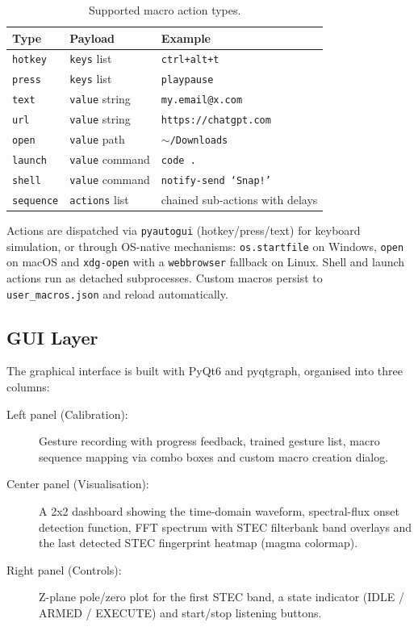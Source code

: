 \documentclass[12pt,a4paper]{article}
\begin{document}
\begin{table}[h]
\centering
\caption{Supported macro action types.}
\label{tab:macro-types}
\begin{tabular}{@{}lll@{}}
\toprule
Type & Payload & Example \\
\midrule
\texttt{hotkey} & \texttt{keys} list & \texttt{ctrl+alt+t} \\
\texttt{press}  & \texttt{keys} list & \texttt{playpause} \\
\texttt{text}   & \texttt{value} string & \texttt{my.email@x.com} \\
\texttt{url}    & \texttt{value} string & \texttt{https://chatgpt.com} \\
\texttt{open}   & \texttt{value} path  & \texttt{$\sim$/Downloads} \\
\texttt{launch} & \texttt{value} command & \texttt{code .} \\
\texttt{shell}  & \texttt{value} command & \texttt{notify-send `Snap!'} \\
\texttt{sequence} & \texttt{actions} list & chained sub-actions with delays \\
\bottomrule
\end{tabular}
\end{table}

Actions are dispatched via \texttt{pyautogui} (hotkey/press/text) for keyboard simulation, or through OS-native mechanisms: \texttt{os.startfile} on Windows, \texttt{open} on macOS and \texttt{xdg-open} with a \texttt{webbrowser} fallback on Linux. Shell and launch actions run as detached subprocesses. Custom macros persist to \texttt{user\_macros.json} and reload automatically.

\subsection{GUI Layer}

The graphical interface is built with PyQt6 and pyqtgraph, organised into three columns:

\begin{description}
    \item[Left panel (Calibration):] Gesture recording with progress feedback, trained gesture list, macro sequence mapping via combo boxes and custom macro creation dialog.
    \item[Center panel (Visualisation):] A 2x2 dashboard showing the time-domain waveform, spectral-flux onset detection function, FFT spectrum with STEC filterbank band overlays and the last detected STEC fingerprint heatmap (magma colormap).
    \item[Right panel (Controls):] Z-plane pole/zero plot for the first STEC band, a state indicator (IDLE / ARMED / EXECUTE) and start/stop listening buttons.
\end{description}
\end{document}
